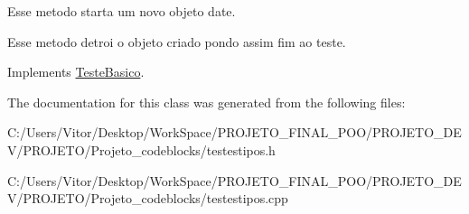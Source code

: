 Esse metodo starta um novo objeto date. 

Esse metodo detroi o objeto criado pondo assim fim ao teste. 

Implements \hyperlink{class_teste_basico_a9801730ac8a0acc39a901a179aa91e97}{Teste\-Basico}.



The documentation for this class was generated from the following files\-:\begin{DoxyCompactItemize}
\item 
C\-:/\-Users/\-Vitor/\-Desktop/\-Work\-Space/\-P\-R\-O\-J\-E\-T\-O\-\_\-\-F\-I\-N\-A\-L\-\_\-\-P\-O\-O/\-P\-R\-O\-J\-E\-T\-O\-\_\-\-D\-E\-V/\-P\-R\-O\-J\-E\-T\-O/\-Projeto\-\_\-codeblocks/testestipos.\-h\item 
C\-:/\-Users/\-Vitor/\-Desktop/\-Work\-Space/\-P\-R\-O\-J\-E\-T\-O\-\_\-\-F\-I\-N\-A\-L\-\_\-\-P\-O\-O/\-P\-R\-O\-J\-E\-T\-O\-\_\-\-D\-E\-V/\-P\-R\-O\-J\-E\-T\-O/\-Projeto\-\_\-codeblocks/testestipos.\-cpp\end{DoxyCompactItemize}
